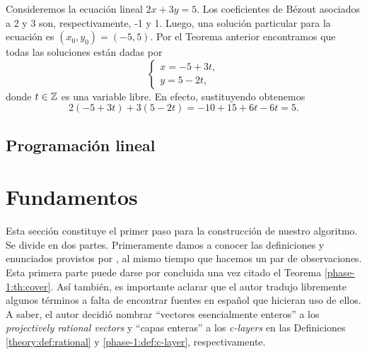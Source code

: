 \begin{example}
	Consideremos la ecuación lineal $2x + 3y = 5$. Los coeficientes de Bézout asociados a 2 y 3 son,
	respectivamente, -1 y 1. Luego, una solución particular para la ecuación es $(x_0, y_0) = (-5, 5)$.
	Por el Teorema anterior encontramos que todas las soluciones están dadas por
	\begin{equation*}
		\begin{cases}
			x = -5 + 3t, \\
			y = 5 - 2t,
		\end{cases}
	\end{equation*}
	donde $t \in \mathbb{Z}$ es una variable libre. En efecto, sustituyendo obtenemos
	\begin{equation*}
		2(-5 + 3t) + 3(5 - 2t) = -10 + 15 + 6t - 6t = 5.
	\end{equation*}
\end{example}

\subsection{Programación lineal}

\section{Fundamentos}
\noindent
Esta sección constituye el primer paso para la construcción de nuestro algoritmo. Se divide en dos
partes. Primeramente damos a conocer las definiciones y enunciados provistos por \cite{herr}, al
mismo tiempo que hacemos un par de observaciones. Esta primera parte puede darse por concluida una
vez citado el Teorema \ref{phase-1:th:cover}. Así también, es importante aclarar que el autor
tradujo libremente algunos términos a falta de encontrar fuentes en español que hicieran uso de
ellos. A saber, el autor decidió nombrar ``vectores esencialmente enteros'' a los
\textit{projectively rational vectors} y ``capas enteras'' a los \textit{c-layers} en las
Definiciones \ref{theory:def:rational} y \ref{phase-1:def:c-layer}, respectivamente.


